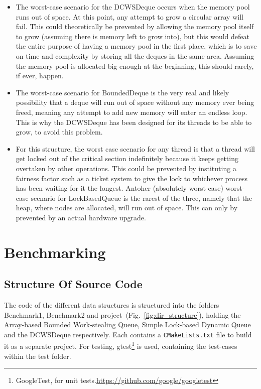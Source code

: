 \documentclass [10pt]{scrartcl}
\begin{document}
   \begin{itemize}
      \item The worst-case scenario for the DCWSDeque occurs when the memory pool runs out of space. At this point, any attempt to grow a circular array will fail. This could theoretically be prevented by allowing the memory pool itself to grow (assuming there is memory left to grow into), but this would defeat the entire purpose of having a memory pool in the first place, which is to save on time and complexity by storing all the deques in the same area. Assuming the memory pool is allocated big enough at the beginning, this should rarely, if ever, happen.
      
      \item The worst-case scenario for BoundedDeque is the very real and likely possibility that a deque will run out of space without any memory ever being freed, meaning any attempt to add new memory will enter an endless loop. This is why the DCWSDeque has been designed for its threads to be able to grow, to avoid this problem.
      
      \item For this structure, the worst case scenario for any thread is that a thread will get locked out of the critical section indefinitely because it keeps getting overtaken by other operations. This could be prevented by instituting a fairness factor such as a ticket system to give the lock to whichever process has been waiting for it the longest.
      Antoher (absolutely worst-case) worst-case scenario for LockBasedQueue is the rarest of the three, namely that the heap, where nodes are allocated, will run out of space. This can only by prevented by an actual hardware upgrade.
   \end{itemize}
   
   \section{Benchmarking}
   
   \subsection{Structure Of Source Code}
   The code of the different data structures is structured into the folders Benchmark1, Benchmark2 and project~(Fig.~\ref{fig:dir_structure}), holding the Array-based Bounded Work-stealing Queue, Simple Lock-based Dynamic Queue and the DCWSDeque respectively. Each  contains a \texttt{CMakeLists.txt} file to build it as a separate project. For testing, gtest\footnote{GoogleTest, for unit tests.\url{https://github.com/google/googletest}} is used, containing the test-cases within the test folder.
   
\end{document}
